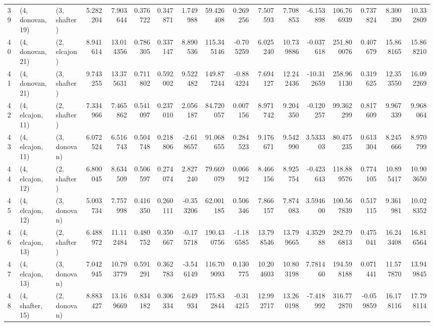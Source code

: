 \begin{tabular}{lllrrrrrrrrrrrrrr}
39 &  (4, donovan, 19) &     (3, shafter) &   5.282204 &   7.903644 &   0.376722 &  0.347871 &   1.749988 &   59.426408 &  0.269256 &   7.507593 &   7.708853 &  -6.153898 &   106.766939 &  0.737824 &   8.300390 &  10.332809 \\
40 &  (4, donovan, 21) &     (2, elcajon) &   8.941614 &  13.014356 &   0.786305 &  0.337147 &   8.890536 &  115.345146 & -0.705259 &   6.025240 &  10.739886 &  -0.037618 &   251.800076 &  0.407679 &  15.868165 &  15.868210 \\
41 &  (4, donovan, 21) &     (3, shafter) &   9.743255 &  13.375631 &   0.711802 &  0.592002 &   9.522482 &  149.877244 & -0.884224 &   7.694127 &  12.242436 & -10.312659 &   258.961130 &  0.319625 &  12.353550 &  16.092269 \\
42 &  (4, elcajon, 11) &     (2, shafter) &   7.334966 &   7.465862 &   0.541097 &  0.237010 &   2.056187 &   84.720057 &  0.007156 &   8.971742 &   9.204350 &  -0.120257 &    99.362299 &  0.817609 &   9.967339 &   9.968064 \\
43 &  (4, elcajon, 11) &     (3, donovan) &   6.072524 &   6.516743 &   0.504748 &  0.218806 &  -2.618657 &   91.068655 &  0.284523 &   9.176671 &   9.542990 &   3.533303 &    80.475235 &  0.613304 &   8.245666 &   8.970799 \\
44 &  (4, elcajon, 12) &     (2, shafter) &   6.800045 &   8.634509 &   0.506597 &  0.274074 &   2.827240 &   79.669079 &  0.066912 &   8.466156 &   8.925754 &  -0.423643 &   118.889576 &  0.774105 &  10.895417 &  10.903650 \\
45 &  (4, elcajon, 12) &     (3, donovan) &   5.003734 &   7.757998 &   0.416350 &  0.260111 &  -0.353206 &   62.001185 &  0.506346 &   7.866157 &   7.874083 &   3.594600 &   100.567839 &  0.517115 &   9.361981 &  10.028352 \\
46 &  (4, elcajon, 13) &     (2, shafter) &   6.488972 &  11.112484 &   0.480752 &  0.350667 &  -0.175718 &  190.430756 & -1.186585 &  13.798546 &  13.799665 &   4.352988 &   282.796813 &  0.475041 &  16.243408 &  16.816564 \\
47 &  (4, elcajon, 13) &     (3, donovan) &   7.042945 &  10.793779 &   0.591291 &  0.362783 &  -3.546149 &  116.709093 &  0.130775 &  10.204603 &  10.803198 &   7.781460 &   194.598188 &  0.071441 &  11.577870 &  13.949845 \\
48 &  (4, shafter, 15) &     (2, donovan) &   8.883427 &  13.169669 &   0.834182 &  0.306334 &   2.649934 &  175.832844 & -0.314215 &  12.992717 &  13.260198 &  -7.418992 &   316.772870 & -0.059859 &  16.178116 &  17.798114 \\

\end{tabular}
